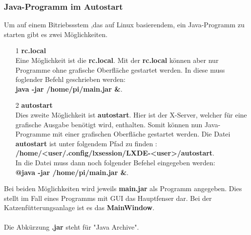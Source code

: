 \subsubsection{Java-Programm im Autostart}\label{subsubsec:Autostart}
Um auf einem Bitriebssstem ,das auf Linux basierendem, ein Java-Programm zu starten gibt es zwei Möglichkeiten.
\begin{itemize}
\item[1] \textbf{rc.local}
\\ Eine Möglichkeit ist die \textbf{rc.local}. Mit der \textbf{rc.local} können aber nur Programme ohne grafische Oberfläche gestartet werden. In diese muss foglender Befehl geschrieben werden: 
\\ \textbf{java -jar /home/pi/main.jar \&}.
\item[2] \textbf{autostart}
\\ Dies zweite Möglichkeit ist \textbf{autostart}. Hier ist der X-Server, welcher für eine grafische Ausgabe benötigt wird, enthalten. Somit können nun Java-Programme mit einer grafischen Oberfläche gestartet werden. Die Datei \textbf{autostart} ist unter folgendem Pfad zu finden : 
\\ \textbf{/home/<user/.config/lxsession/LXDE-<user>/autostart}. 
\\ In die Datei muss dann noch folgender Befehel eingegeben werden: 
\\ \textbf{@java -jar /home/pi/main.jar \&}.
\end{itemize} 
Bei beiden Möglichkeiten wird jeweils \textbf{main.jar} als Programm angegeben. Dies stellt im Fall eines Programms mit GUI das Hauptfenser dar. Bei der Katzenfütterungsanlage ist es das \textbf{MainWindow}.
\\ \\ Die Abkürzung \textbf{.jar} steht für "Java Archive".

\newpage

